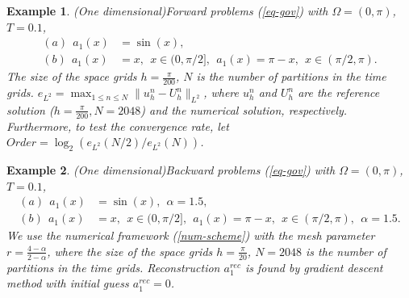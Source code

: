 \documentclass[11pt]{article}
\newtheorem{example}{Example}
\numberwithin{equation}{section}
\begin{document}
\begin{example}(One dimensional)\label{ex1}
Forward problems (\ref{eq-gov}) with $\Omega=(0,\pi)$, $T=0.1$,
\begin{align*}
(a) ~~a_1(x)&=\sin(x),\\
(b)~~a_1(x)&=x,~~x\in(0,\pi/2],~~a_1(x)=\pi-x,~~x\in(\pi/2,\pi).
\end{align*}
The size of the space grids $h=\frac{\pi}{200}$, $N$ is the number of partitions in the time
grids. $e_{L^2}=\max_{1\leq n\leq N}\|u_h^n-U_h^n\|_{L^2}$, where $u_h^n$ and $U_h^n$ are the reference solution ($h=\frac{\pi}{200},N=2048$) and the numerical solution, respectively. Furthermore, to test the convergence rate, let $Order=\log_2(e_{L^2}(N/2)/e_{L^2}(N))$. 
\end{example}


\begin{example}(One dimensional)\label{ex2}
Backward problems (\ref{eq-gov}) with $\Omega=(0,\pi)$, $T=0.1$,
\begin{align*}
(a) ~~a_1(x)&=\sin(x),~~\alpha=1.5,\\
(b)~~a_1(x)&=x,~~x\in(0,\pi/2],~~a_1(x)=\pi-x,~~x\in(\pi/2,\pi),~~\alpha=1.5.
\end{align*}
We use the numerical framework (\ref{num-scheme}) with the mesh parameter $r=\frac{4-\alpha}{2-\alpha}$, where the size of the space grids $h=\frac{\pi}{20}$, $N=2048$ is the number of partitions in the time grids. Reconstruction $a_1^{rec}$ is found by gradient descent method with initial guess $a_1^{rec}=0$.
\end{example}
\end{document}
